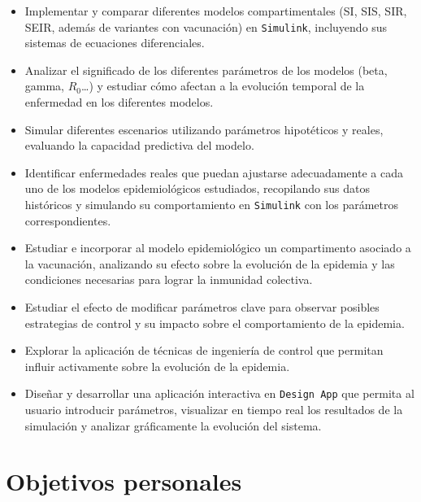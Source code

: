 \begin{itemize}
  \item Implementar y comparar diferentes modelos compartimentales (SI, SIS, SIR, SEIR, además de variantes con vacunación) en \texttt{Simulink}, incluyendo sus sistemas de ecuaciones diferenciales.
  \item Analizar el significado de los diferentes parámetros de los modelos (beta, gamma, \(R_0\)…) y estudiar cómo afectan a la evolución temporal de la enfermedad en los diferentes modelos.
  \item Simular diferentes escenarios utilizando parámetros hipotéticos y reales, evaluando la capacidad predictiva del modelo.
  \item Identificar enfermedades reales que puedan ajustarse adecuadamente a cada uno de los modelos epidemiológicos estudiados, recopilando sus datos históricos y simulando su comportamiento en \texttt{Simulink} con los parámetros correspondientes.
  \item Estudiar e incorporar al modelo epidemiológico un compartimento asociado a la vacunación, analizando su efecto sobre la evolución de la epidemia y las condiciones necesarias para lograr la inmunidad colectiva.
  \item Estudiar el efecto de modificar parámetros clave para observar posibles estrategias de control y su impacto sobre el comportamiento de la epidemia.
  \item Explorar la aplicación de técnicas de ingeniería de control que permitan influir activamente sobre la evolución de la epidemia.
  \item Diseñar y desarrollar una aplicación interactiva en \texttt{Design App} que permita al usuario introducir parámetros, visualizar en tiempo real los resultados de la simulación y analizar gráficamente la evolución del sistema.
\end{itemize}

\section{Objetivos personales}

